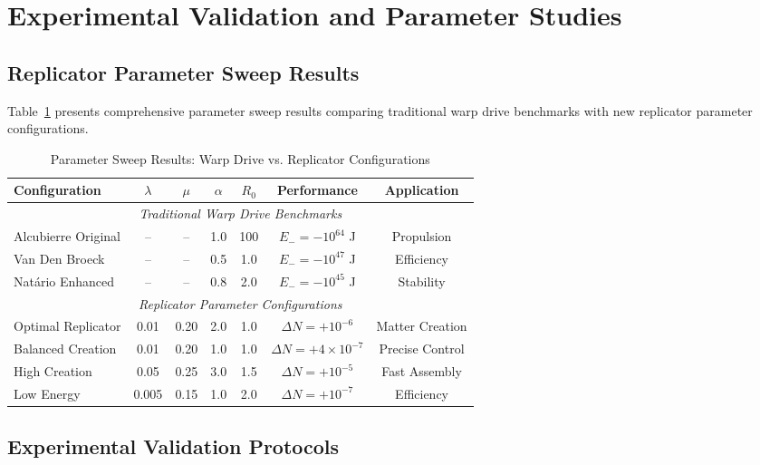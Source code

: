 \documentclass[11pt]{article}
\begin{document}
\section*{Experimental Validation and Parameter Studies}

\subsection*{Replicator Parameter Sweep Results}

Table~\ref{tab:warp_replicator_params} presents comprehensive parameter sweep results comparing traditional warp drive benchmarks with new replicator parameter configurations.

\begin{table}[h]
\centering
\caption{Parameter Sweep Results: Warp Drive vs. Replicator Configurations}
\label{tab:warp_replicator_params}
\begin{tabular}{lcccccc}
\toprule
\textbf{Configuration} & \textbf{$\lambda$} & \textbf{$\mu$} & \textbf{$\alpha$} & \textbf{$R_0$} & \textbf{Performance} & \textbf{Application} \\
\midrule
\multicolumn{7}{c}{\textit{Traditional Warp Drive Benchmarks}} \\
\midrule
Alcubierre Original & -- & -- & 1.0 & 100 & $E_- = -10^{64}$ J & Propulsion \\
Van Den Broeck & -- & -- & 0.5 & 1.0 & $E_- = -10^{47}$ J & Efficiency \\
Natário Enhanced & -- & -- & 0.8 & 2.0 & $E_- = -10^{45}$ J & Stability \\
\midrule
\multicolumn{7}{c}{\textit{Replicator Parameter Configurations}} \\
\midrule
Optimal Replicator & 0.01 & 0.20 & 2.0 & 1.0 & $\Delta N = +10^{-6}$ & Matter Creation \\
Balanced Creation & 0.01 & 0.20 & 1.0 & 1.0 & $\Delta N = +4 \times 10^{-7}$ & Precise Control \\
High Creation & 0.05 & 0.25 & 3.0 & 1.5 & $\Delta N = +10^{-5}$ & Fast Assembly \\
Low Energy & 0.005 & 0.15 & 1.0 & 2.0 & $\Delta N = +10^{-7}$ & Efficiency \\
\bottomrule
\end{tabular}
\end{table}

\subsection*{Experimental Validation Protocols}
\end{document}
